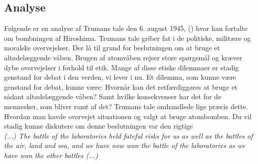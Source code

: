 \newpage
\subsection{Analyse}
Følgende er en analyse af Trumans tale den 6. august 1945, (\cite{TrumanSpeech})
hvor han fortalte om bombningen af Hiroshima. Trumans tale griber fat i de politiske, militære og moralske overvejelser. Der lå til grund for beslutningen om at bruge et altødelæggende våben. Brugen af atomvåben rejser store spørgsmål og kræver dybe overvejelser i forhold til etik. Mange af disse etiske dilemmaer er stadig genstand for debat i den verden, vi lever i nu. Et dilemma, som kunne være genstand for debat, kunne være: Hvornår kan det retfærdiggøres at bruge et sådant altødelæggende våben? Samt hvilke konsekvenser har det for de mennesker, som bliver ramt af det? Trumans tale omhandlede lige præcis dette. Hvordan man havde overvejet situationen og valgt at bruge atombomben. Du vil stadig kunne diskutere om denne beslutningen var den rigtige \\
\emph{(...) The battle of the laboratories held fateful risks for us as well as the battles of the air, land and sea, and we have now won the battle of the laboratories as we have won the other battles (...)} 
